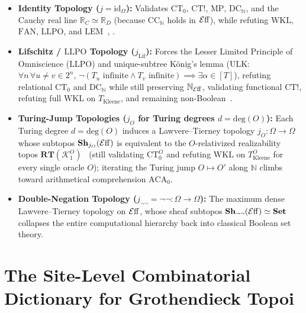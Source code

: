 \begin{itemize}

  \item \textbf{Identity Topology ($j = \mathrm{id}_\Omega$):} Validates $\mathrm{CT}_0$, $\mathrm{CT}!$, $\mathrm{MP}$, $\mathrm{DC}_{\mathbb{N}}$, and the Cauchy real line $\mathbb{R}_C \simeq \mathbb{R}_D$ (because $\mathrm{CC}_{\mathbb{N}}$ holds in $\mathcal{E}\mathrm{ff}$), while refuting $\mathrm{WKL}$, $\mathrm{FAN}$, $\mathrm{LLPO}$, and $\mathrm{LEM}$~\cite{Hyland82}, \cite[\S 3.2]{vanOosten08}.

  \item \textbf{Lifschitz / $\mathrm{LLPO}$ Topology ($j_{\mathrm{Lif}}$):} Forces the Lesser Limited Principle of Omniscience ($\mathrm{LLPO}$) and unique-subtree K\"onig's lemma ($\mathrm{ULK}$: $\forall n\,\forall u \neq v \in 2^n,\, \neg(T_u\text{ infinite} \wedge T_v\text{ infinite}) \implies \exists \alpha \in [T]$), refuting relational $\mathrm{CT}_0$ and $\mathrm{DC}_{\mathbb{N}}$ while still preserving $\mathbb{N}_{\mathcal{E}\mathrm{ff}}$, validating functional $\mathrm{CT}!$, refuting full $\mathrm{WKL}$ on $T_{\mathrm{Kleene}}$, and remaining non-Boolean~\cite[\S 4.4]{vanOosten08}.

  \item \textbf{Turing-Jump Topologies ($j_O$ for Turing degrees $d = \mathrm{deg}(O)$):} Each Turing degree $d = \mathrm{deg}(O)$ induces a Lawvere--Tierney topology $j_O: \Omega \to \Omega$ whose subtopos $\mathbf{Sh}_{j_O}(\mathcal{E}\mathrm{ff})$ is equivalent to the $O$-relativized realizability topos $\mathbf{RT}(\mathcal{K}_1^O)$~\cite{LeeVanOosten13} (still validating $\mathrm{CT}_0^O$ and refuting $\mathrm{WKL}$ on $T_{\mathrm{Kleene}}^O$ for every single oracle $O$); iterating the Turing jump $O \mapsto O'$ along $\mathbb{N}$ climbs toward arithmetical comprehension $\mathrm{ACA}_0$.

  \item \textbf{Double-Negation Topology ($j_{\neg\neg} = \neg\neg: \Omega \to \Omega$):} The maximum dense Lawvere--Tierney topology on $\mathcal{E}\mathrm{ff}$, whose sheaf subtopos $\mathbf{Sh}_{\neg\neg}(\mathcal{E}\mathrm{ff}) \simeq \mathbf{Set}$ collapses the entire computational hierarchy back into classical Boolean set theory.

\end{itemize}

\section{The Site-Level Combinatorial Dictionary for Grothendieck Topoi}\label{sec:site-combinatorics}

